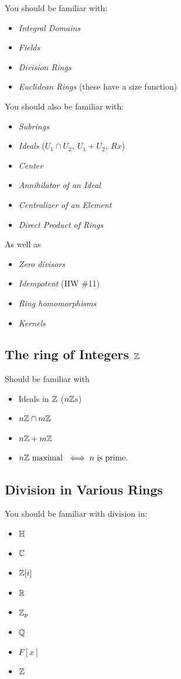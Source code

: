 You should be familiar with:
\begin{itemize}
    \item \textit{Integral Domains} 
    \item \textit{Fields}
    \item \textit{Division Rings}
    \item \textit{Euclidean Rings} (these have a size function)
\end{itemize}
You should also be familiar with:
\begin{itemize}
    \item\textit{Subrings}
    \item \textit{Ideals} ($U_1\cap U_2, \ U_1+U_2, \ Rx$)
    \item \textit{Center}
    \item \textit{Annihilator of an Ideal}
    \item \textit{Centralizer of an Element}
    \item \textit{Direct Product of Rings}
\end{itemize}
As well as
\begin{itemize}
    \item \textit{Zero divisors}
    \item \textit{Idempotent} (HW \#11)
    \item \textit{Ring homomorphisms}
    \item \textit{Kernels}
\end{itemize}
\subsection*{The ring of Integers ${\mathbb{ Z}}$}
Should be familiar with 
\begin{itemize}
    \item Ideals in ${\mathbb{ Z}}$ ($n{\mathbb{ Z}}$s)
    \item $n{\mathbb{ Z}}\cap m{\mathbb{ Z}}$
    \item $n{\mathbb{ Z}}+m{\mathbb{ Z}}$
    \item $n{\mathbb{ Z}} \text{ maximal }\iff n \text{ is prime.}$
\end{itemize}
\subsection*{Division in Various Rings}
You should be familiar with division in:
\begin{itemize}
    \item ${\mathbb{ H}}$
    \item ${\mathbb{ C}}$
    \item ${\mathbb{ Z}}[i]$
    \item ${\mathbb{ R}}$
    \item ${\mathbb{ Z}}_p$
    \item ${\mathbb{ Q}}$
    \item $F[x]$
    \item ${\mathbb{ Z}}$
\end{itemize}
